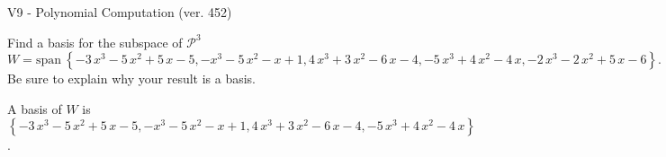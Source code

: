 \begin{exercise}
  \begin{exerciseTitle}V9 - Polynomial Computation (ver. 452)\end{exerciseTitle}
  \begin{exerciseStatement}
    Find a basis for the subspace of \(\mathcal{P}^3\) 
\[W=\mathrm{span}\ \left\{-3 \, x^{3} - 5 \, x^{2} + 5 \, x - 5 , -x^{3} - 5 \, x^{2} - x + 1 , 4 \, x^{3} + 3 \, x^{2} - 6 \, x - 4 , -5 \, x^{3} + 4 \, x^{2} - 4 \, x , -2 \, x^{3} - 2 \, x^{2} + 5 \, x - 6\right\}.\]
 Be sure to explain why your result is a basis.


  \end{exerciseStatement}
  \begin{exerciseAnswer}
   A basis of \(W\) is  \(\left\{-3 \, x^{3} - 5 \, x^{2} + 5 \, x - 5 , -x^{3} - 5 \, x^{2} - x + 1 , 4 \, x^{3} + 3 \, x^{2} - 6 \, x - 4 , -5 \, x^{3} + 4 \, x^{2} - 4 \, x\right\}\).
  


  \end{exerciseAnswer}
\end{exercise}